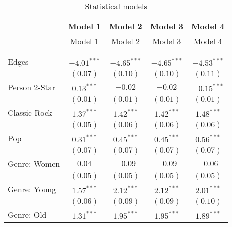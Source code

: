 
\begin{center}
\begin{longtable}{l c c c c}
\toprule
 & Model 1 & Model 2 & Model 3 & Model 4 \\
\midrule
\endfirsthead
\toprule
 & Model 1 & Model 2 & Model 3 & Model 4 \\
\midrule
\endhead
\bottomrule
\endfoot
\bottomrule
\multicolumn{5}{l}{\scriptsize{$^{***}p<0.001$; $^{**}p<0.01$; $^{*}p<0.05$}}\\
\caption{Statistical models}
\label{table:coefficients}
\endlastfoot \\
Edges                                         & $-4.01^{***}$ & $-4.65^{***}$ & $-4.65^{***}$ & $-4.53^{***}$ \\
                                              & $(0.07)$      & $(0.10)$      & $(0.10)$      & $(0.11)$      \\
Person 2-Star                                 & $0.13^{***}$  & $-0.02$       & $-0.02$       & $-0.15^{***}$ \\
                                              & $(0.01)$      & $(0.01)$      & $(0.01)$      & $(0.01)$      \\
Classic Rock                                  & $1.37^{***}$  & $1.42^{***}$  & $1.42^{***}$  & $1.48^{***}$  \\
                                              & $(0.05)$      & $(0.06)$      & $(0.06)$      & $(0.06)$      \\
Pop                                           & $0.31^{***}$  & $0.45^{***}$  & $0.45^{***}$  & $0.56^{***}$  \\
                                              & $(0.07)$      & $(0.07)$      & $(0.07)$      & $(0.07)$      \\
Genre: Women                                  & $0.04$        & $-0.09$       & $-0.09$       & $-0.06$       \\
                                              & $(0.05)$      & $(0.05)$      & $(0.05)$      & $(0.05)$      \\
Genre: Young                                  & $1.57^{***}$  & $2.12^{***}$  & $2.12^{***}$  & $2.01^{***}$  \\
                                              & $(0.06)$      & $(0.09)$      & $(0.09)$      & $(0.10)$      \\
Genre: Old                                    & $1.31^{***}$  & $1.95^{***}$  & $1.95^{***}$  & $1.89^{***}$  \\

\end{longtable}
\end{center}
